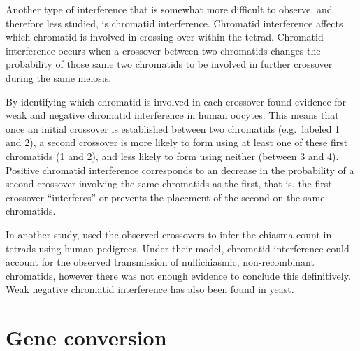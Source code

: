 Another type of interference that is somewhat more difficult to observe, and therefore less studied, is chromatid interference.
Chromatid interference affects which chromatid is involved in crossing over within the tetrad.
Chromatid interference occurs when a crossover between two chromatids changes the probability of those same two chromatids to be involved in further crossover during the same meiosis.

By identifying which chromatid is involved in each crossover \citet{Hou2013} found evidence for weak and negative chromatid interference in human oocytes.
This means that once an initial crossover is established between two chromatids (e.g.\ labeled 1 and 2), a second crossover is more likely to form using at least one of these first chromatids (1 and 2), and less likely to form using neither (between 3 and 4).
Positive chromatid interference corresponds to an decrease in the probability of a second crossover involving the same chromatids as the first, that is, the first crossover ``interferes'' or prevents the placement of the second on the same chromatids.

In another study, \citet{Fledel-Alon2009} used the observed crossovers to infer the chiasma count in tetrads using human pedigrees.
Under their model, chromatid interference could account for the observed transmission of nullichiasmic, non-recombinant chromatids, however there was not enough evidence to conclude this definitively.
Weak negative chromatid interference has also been found in yeast\cite{Zhao1995a}.



\section{Gene conversion}



